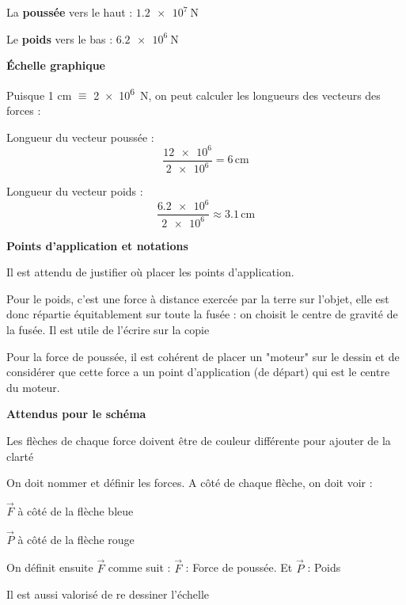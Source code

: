 \documentclass[answers]{exam}
\begin{document}
\begin{questions}
\begin{solution}
    \begin{compactitem}
      \item La \textbf{poussée} vers le haut : \(\SI{1.2e7}{\newton}\)
      \item Le \textbf{poids} vers le bas : \(\SI{6.2e6}{\newton}\)
    \end{compactitem}
    \vspace{1em}
    \textbf{Échelle graphique}
    \vspace{1em}
    \begin{compactitem}
      \item Puisque 1 cm $\equiv$ \SI{2e6}{\newton}, on peut calculer les longueurs des vecteurs des forces :
      \item Longueur du vecteur poussée :
      \[ 
      \frac{\num{12e6}}{\num{2e6}} = 6\,\text{cm} 
      \]
      \item Longueur du vecteur poids :
      \[
      \frac{\num{6.2e6}}{\num{2e6}} \approx 3.1\,\text{cm}
      \]
    \end{compactitem}
    \vspace{1em}

    \textbf{Points d'application et notations}
    \begin{compactitem}
      \item Il est attendu de justifier où placer les points d'application. 
      \item Pour le poids, c'est une force à distance exercée par la terre sur l'objet, elle est donc répartie équitablement sur toute la fusée : on choisit le centre de gravité de la fusée. Il est utile de l'écrire sur la copie
      \item Pour la force de poussée, il est cohérent de placer un "moteur" sur le dessin et de considérer que cette force a un point d'application (de départ) qui est le centre du moteur.
    \end{compactitem}
    
    \vspace{1em}
    
    \textbf{Attendus pour le schéma}
    \begin{compactitem}
      \item Les flèches de chaque force doivent être de couleur différente pour ajouter de la clarté 
      \item On doit nommer et définir les forces. A côté de chaque flèche, on doit voir : 
      \begin{compactitem}
        \item $\vec{F}$ à côté de la flèche bleue  
        \item $\vec{P}$ à côté de la flèche rouge 
        \item On définit ensuite $\vec{F}$  comme suit : $\vec{F}$ : Force de poussée. Et $\vec{P}$ : Poids
      \end{compactitem}
      \item Il est aussi valorisé de re dessiner l'échelle 
    \end{compactitem}
    

\end{solution}
\end{questions}
\end{document}
